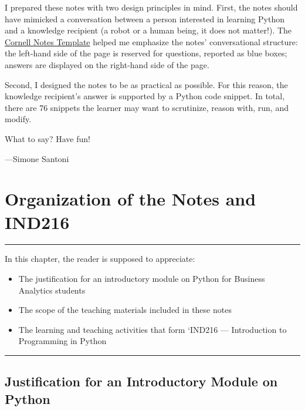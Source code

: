 \documentclass[a4paper,11pt]{book}
\begin{document}
\quad I prepared these notes with two design principles in mind. First, the notes should have mimicked a conversation between a person interested in learning Python and a knowledge recipient (a robot or a human being, it does not matter!).  The \href{https://en.wikipedia.org/wiki/Cornell_Notes}{Cornell Notes Template} helped me emphasize the notes' conversational structure: the left-hand side of the page is reserved for questions, reported as blue boxes; answers are displayed on the right-hand side of the page.

\quad Second, I designed the notes to be as practical as possible. For this reason, the knowledge recipient's answer is supported by a Python code snippet. In total, there are 76 snippets the learner may want to scrutinize, reason with, run, and modify.



\quad What to say? Have fun!

\vspace{2em}

---Simone Santoni


\chapter{Organization of the Notes and IND216}
\label{ch:organization}
\par\noindent\rule{\textwidth}{0.4pt}

In this chapter, the reader is supposed to appreciate:

\begin{itemize}
	\item The justification for an introductory module on Python for Business Analytics students
	\item The scope of the teaching materials included in these notes 
	\item The learning and teaching activities that form `IND216 --- Introduction to Programming in Python
\end{itemize}

\par\noindent\rule{\textwidth}{0.4pt}

\vspace{1em}

\section{Justification for an Introductory Module on Python}
\end{document}
